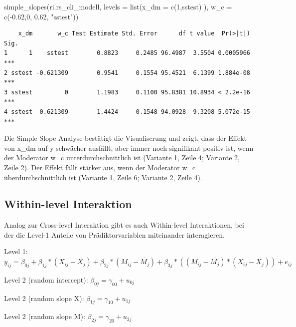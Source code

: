 \documentclass[
  letterpaper,
  DIV=11,
  numbers=noendperiod]{scrreprt}
\newenvironment{Shaded}{\begin{snugshade}}{\end{snugshade}}
\newcommand{\AttributeTok}[1]{\textcolor[rgb]{0.40,0.45,0.13}{#1}}
\newcommand{\DecValTok}[1]{\textcolor[rgb]{0.68,0.00,0.00}{#1}}
\newcommand{\FloatTok}[1]{\textcolor[rgb]{0.68,0.00,0.00}{#1}}
\newcommand{\FunctionTok}[1]{\textcolor[rgb]{0.28,0.35,0.67}{#1}}
\newcommand{\NormalTok}[1]{\textcolor[rgb]{0.00,0.23,0.31}{#1}}
\newcommand{\SpecialCharTok}[1]{\textcolor[rgb]{0.37,0.37,0.37}{#1}}
\newcommand{\StringTok}[1]{\textcolor[rgb]{0.13,0.47,0.30}{#1}}
\begin{document}
\begin{Shaded}
\begin{Highlighting}[]
\FunctionTok{simple\_slopes}\NormalTok{(ri.rs\_cli\_modell,}
              \AttributeTok{levels =} \FunctionTok{list}\NormalTok{(}\AttributeTok{x\_dm =} \FunctionTok{c}\NormalTok{(}\DecValTok{1}\NormalTok{,}\StringTok{\textquotesingle{}sstest\textquotesingle{}}\NormalTok{) ),}
              \AttributeTok{w\_c =} \FunctionTok{c}\NormalTok{(}\SpecialCharTok{{-}}\FloatTok{0.62}\NormalTok{,}\DecValTok{0}\NormalTok{, }\FloatTok{0.62}\NormalTok{, }\StringTok{"sstest"}\NormalTok{))}
\end{Highlighting}
\end{Shaded}

\begin{verbatim}
    x_dm       w_c Test Estimate Std. Error      df t value  Pr(>|t|) Sig.
1      1    sstest        0.8823     0.2485 96.4987  3.5504 0.0005966  ***
2 sstest -0.621309        0.9541     0.1554 95.4521  6.1399 1.884e-08  ***
3 sstest         0        1.1983     0.1100 95.8381 10.8934 < 2.2e-16  ***
4 sstest  0.621309        1.4424     0.1548 94.0928  9.3208 5.072e-15  ***
\end{verbatim}

Die Simple Slope Analyse bestätigt die Visualiserung und zeigt, dass der
Effekt von x\_dm auf y schwächer ausfällt, aber immer noch signifikant
positiv ist, wenn der Moderator w\_c unterdurchschnittlich ist (Variante
1, Zeile 4; Variante 2, Zeile 2). Der Effekt fällt stärker aus, wenn der
Moderator w\_c überdurchschnittlich ist (Variante 1, Zeile 6; Variante
2, Zeile 4).

\subsection{Within-level Interaktion}\label{within-level-interaktion}

Analog zur Cross-level Interaktion gibt es auch Within-level
Interaktionen, bei der die Level-1 Anteile von Prädiktorvariablen
miteinander interagieren.

Level 1:
\(y_{ij} = \beta_{0j} + \beta_{1j}*(X_{ij}-\overline{X_j}) + \beta_{2j}*(M_{ij}-\overline{M_j}) + \beta_{3j}*((M_{ij}-\overline{M_j})*(X_{ij}-\overline{X_j})) + e_{ij}\)

Level 2 (random intercept): \(\beta_{0j} = \gamma_{00} + u_{0j}\)

Level 2 (random slope X): \(\beta_{1j} = \gamma_{10} + u_{1j}\)

Level 2 (random slope M): \(\beta_{2j} = \gamma_{20} + u_{2j}\)
\end{document}

